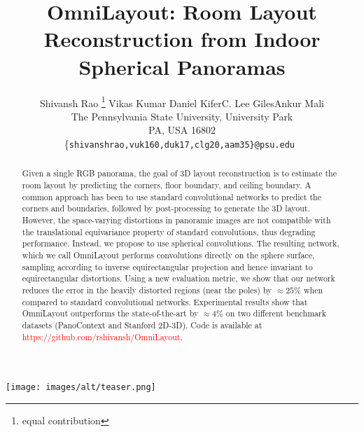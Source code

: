 \documentclass[final]{cvpr}
\begin{document}
\title{OmniLayout: Room Layout Reconstruction from Indoor Spherical Panoramas}



\author{Shivansh Rao \thanks{equal contribution} \qquad Vikas Kumar \footnotemark[1] \qquad Daniel Kifer\qquad C. Lee Giles\qquad Ankur Mali\\The Pennsylvania State University, University Park\\
PA, USA 16802\\
\{\tt\small shivanshrao,vuk160,duk17,clg20,aam35\}@psu.edu
}

\maketitle

\begin{strip}\centering
\texttt{[image: images/alt/teaser.png]}
\end{strip}

\begin{abstract}
 
Given a single RGB panorama, the goal of 3D layout reconstruction is to estimate the room layout by predicting the corners, floor boundary, and ceiling boundary. A common approach has been to use standard convolutional networks to predict the corners and boundaries, followed by post-processing to generate the 3D layout. However, the space-varying distortions in panoramic images are not compatible with the translational equivariance property of standard convolutions, thus degrading performance. Instead, we propose to use spherical convolutions. The resulting network, which we call OmniLayout performs convolutions directly on the sphere surface, sampling according to inverse equirectangular projection and hence invariant to equirectangular distortions. Using a new evaluation metric, we show that our network reduces the error in the heavily distorted regions (near the poles) by $\approx 25 \%$ when compared to standard convolutional networks. Experimental results show that OmniLayout outperforms the state-of-the-art by $\approx$4$\%$ on two different benchmark datasets (PanoContext and Stanford 2D-3D). Code is available at \textcolor{red}{ https://github.com/rshivansh/OmniLayout}.
\end{abstract}
\end{document}
